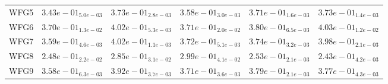 \documentclass{article}
\begin{document}
\begin{table}
\begin{scriptsize}
\begin{tabular}{llllll}
WFG5 & $  3.43e-01_{ 5.0e-03}$ & \cellcolor{gray25}$  3.73e-01_{ 2.8e-03}$ & $  3.58e-01_{ 3.0e-03}$ & $  3.71e-01_{ 1.6e-03}$ & \cellcolor{gray95}$  3.73e-01_{ 1.4e-03}$ \\
WFG6 & $  3.70e-01_{ 1.3e-02}$ & \cellcolor{gray25}$  4.02e-01_{ 5.3e-03}$ & $  3.71e-01_{ 2.0e-02}$ & $  3.80e-01_{ 6.5e-03}$ & \cellcolor{gray95}$  4.03e-01_{ 1.2e-02}$ \\
WFG7 & $  3.59e-01_{ 4.6e-03}$ & \cellcolor{gray95}$  4.02e-01_{ 1.1e-03}$ & $  3.72e-01_{ 5.1e-03}$ & $  3.74e-01_{ 3.2e-03}$ & \cellcolor{gray25}$  3.98e-01_{ 2.1e-03}$ \\
WFG8 & $  2.48e-01_{ 2.2e-02}$ & \cellcolor{gray25}$  2.85e-01_{ 3.1e-02}$ & \cellcolor{gray95}$  2.99e-01_{ 4.1e-02}$ & $  2.53e-01_{ 2.1e-03}$ & $  2.43e-01_{ 4.2e-03}$ \\
WFG9 & $  3.58e-01_{ 6.3e-03}$ & \cellcolor{gray95}$  3.92e-01_{ 3.7e-03}$ & $  3.71e-01_{ 3.6e-03}$ & \cellcolor{gray25}$  3.79e-01_{ 2.1e-03}$ & $  3.77e-01_{ 4.3e-03}$ \\
\hline
\end{tabular}
\end{scriptsize}
\end{table}
\end{document}
